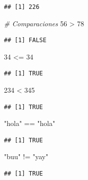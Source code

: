 \documentclass[]{article}
\newenvironment{Shaded}{\begin{snugshade}}{\end{snugshade}}
\newcommand{\DecValTok}[1]{\textcolor[rgb]{0.00,0.00,0.81}{{#1}}}
\newcommand{\StringTok}[1]{\textcolor[rgb]{0.31,0.60,0.02}{{#1}}}
\newcommand{\CommentTok}[1]{\textcolor[rgb]{0.56,0.35,0.01}{\textit{{#1}}}}
\newcommand{\NormalTok}[1]{{#1}}
\begin{document}
\begin{verbatim}
## [1] 226
\end{verbatim}

\begin{Shaded}
\begin{Highlighting}[]
\CommentTok{# Comparaciones}
\DecValTok{56} \NormalTok{>}\StringTok{ }\DecValTok{78} 
\end{Highlighting}
\end{Shaded}

\begin{verbatim}
## [1] FALSE
\end{verbatim}

\begin{Shaded}
\begin{Highlighting}[]
\DecValTok{34} \NormalTok{<=}\StringTok{ }\DecValTok{34}
\end{Highlighting}
\end{Shaded}

\begin{verbatim}
## [1] TRUE
\end{verbatim}

\begin{Shaded}
\begin{Highlighting}[]
\DecValTok{234} \NormalTok{<}\StringTok{ }\DecValTok{345}
\end{Highlighting}
\end{Shaded}

\begin{verbatim}
## [1] TRUE
\end{verbatim}

\begin{Shaded}
\begin{Highlighting}[]
\StringTok{"hola"} \NormalTok{==}\StringTok{ "hola"}
\end{Highlighting}
\end{Shaded}

\begin{verbatim}
## [1] TRUE
\end{verbatim}

\begin{Shaded}
\begin{Highlighting}[]
\StringTok{"buu"} \NormalTok{!=}\StringTok{ "yay"}
\end{Highlighting}
\end{Shaded}

\begin{verbatim}
## [1] TRUE
\end{verbatim}
\end{document}
